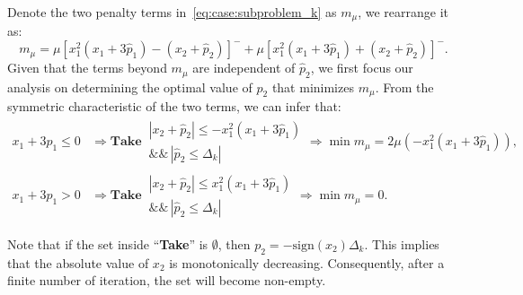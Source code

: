 Denote the two penalty terms in~\eqref{eq:case:subproblem_k} as $m_{\mu}$, we rearrange it as:
\begin{equation}
    m_{\mu} = \mu[x_1^2(x_1+3\hat{p}_1)-(x_2+\hat{p}_2)]^- + \mu[x_1^2(x_1+3\hat{p}_1)+(x_2+\hat{p}_2)]^-.
\end{equation}
Given that the terms beyond $m_{\mu}$ are independent of $\hat{p}_2$, we first focus our analysis on determining the optimal value of $\hat{p}_2$ that minimizes $m_{\mu}$. From the symmetric characteristic of the two terms, we can infer that: 
\begin{align}
x_1 + 3p_1 \leq 0 &\Rightarrow \textbf{Take}\,\begin{array}{c}
     |x_2+\hat{p}_2| \leq -x_1^2(x_1 + 3\hat{p}_1)  \\
     \&\&\,|\hat{p}_2\leq\Delta_k|
\end{array} \Rightarrow \min m_{\mu}=2\mu(-x_1^2(x_1+3\hat{p}_1)), \label{eq:case:mu_1}\\
x_1 + 3p_1 > 0 &\Rightarrow \textbf{Take}\,\begin{array}{c}
     |x_2+\hat{p}_2| \leq x_1^2(x_1 + 3\hat{p}_1)  \label{eq:case:mu_2}\\
     \&\&\,|\hat{p}_2\leq\Delta_k|
\end{array} \Rightarrow \min m_{\mu}=0.
\end{align}

Note that if the set inside ``\textbf{Take}'' is $\emptyset$, then $p_2 = -\mathrm{sign}(x_2)\Delta_k$. This implies that the absolute value of $x_2$ is monotonically decreasing. Consequently, after a finite number of iteration, the set will become non-empty. 

